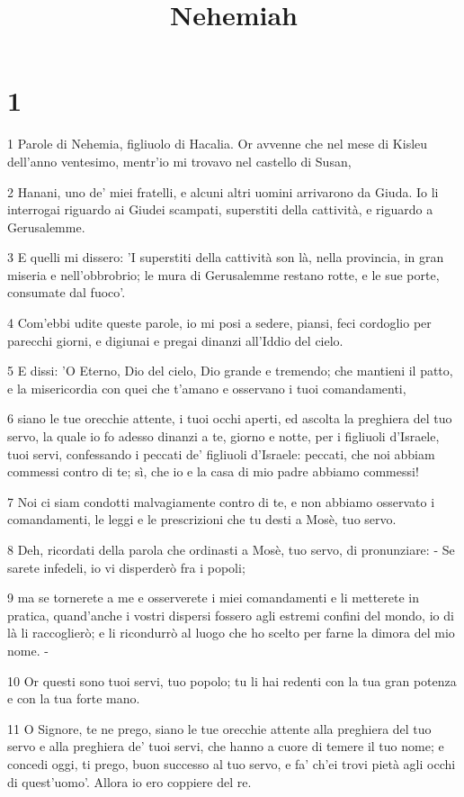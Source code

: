 

\title{Nehemiah}


\chapter{1}

\par 1 Parole di Nehemia, figliuolo di Hacalia. Or avvenne che nel mese di Kisleu dell'anno ventesimo, mentr'io mi trovavo nel castello di Susan,
\par 2 Hanani, uno de' miei fratelli, e alcuni altri uomini arrivarono da Giuda. Io li interrogai riguardo ai Giudei scampati, superstiti della cattività, e riguardo a Gerusalemme.
\par 3 E quelli mi dissero: 'I superstiti della cattività son là, nella provincia, in gran miseria e nell'obbrobrio; le mura di Gerusalemme restano rotte, e le sue porte, consumate dal fuoco'.
\par 4 Com'ebbi udite queste parole, io mi posi a sedere, piansi, feci cordoglio per parecchi giorni, e digiunai e pregai dinanzi all'Iddio del cielo.
\par 5 E dissi: 'O Eterno, Dio del cielo, Dio grande e tremendo; che mantieni il patto, e la misericordia con quei che t'amano e osservano i tuoi comandamenti,
\par 6 siano le tue orecchie attente, i tuoi occhi aperti, ed ascolta la preghiera del tuo servo, la quale io fo adesso dinanzi a te, giorno e notte, per i figliuoli d'Israele, tuoi servi, confessando i peccati de' figliuoli d'Israele: peccati, che noi abbiam commessi contro di te; sì, che io e la casa di mio padre abbiamo commessi!
\par 7 Noi ci siam condotti malvagiamente contro di te, e non abbiamo osservato i comandamenti, le leggi e le prescrizioni che tu desti a Mosè, tuo servo.
\par 8 Deh, ricordati della parola che ordinasti a Mosè, tuo servo, di pronunziare: - Se sarete infedeli, io vi disperderò fra i popoli;
\par 9 ma se tornerete a me e osserverete i miei comandamenti e li metterete in pratica, quand'anche i vostri dispersi fossero agli estremi confini del mondo, io di là li raccoglierò; e li ricondurrò al luogo che ho scelto per farne la dimora del mio nome. -
\par 10 Or questi sono tuoi servi, tuo popolo; tu li hai redenti con la tua gran potenza e con la tua forte mano.
\par 11 O Signore, te ne prego, siano le tue orecchie attente alla preghiera del tuo servo e alla preghiera de' tuoi servi, che hanno a cuore di temere il tuo nome; e concedi oggi, ti prego, buon successo al tuo servo, e fa' ch'ei trovi pietà agli occhi di quest'uomo'. Allora io ero coppiere del re.

